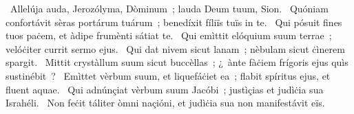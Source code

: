 {~Allelúja}
{%
auda, Jerozólyma, Dòminum~; lauda Deum tuum, Sion.
~Quóniam confortávit sèras portárum tuárum~; benedíxit fíliïs tuïs in te.
~Qui pósuit fines tuos paċem, et àdipe frumènti sátiat te.
~Qui emìttit elóquium suum terrae~; velóċiter currit sermo ejus.
~Qui dat nivem sicut lanam~; nèbulam sicut ċìnerem spargit.
~Mittit crystàllum suum sicut buccèllas~; ¿~ànte fàċiem frígoris ejus quìs sustinébit~?
~Emìttet vèrbum suum, et liquefáċiet ea~; flabit spíritus ejus, et fluent aquae.
~Qui adnúnçiat vèrbum suum Jacóbi~; justìçias et judìċia sua Israhéli.
~Non feċit táliter òmni naçióni, et judìċia sua non manifestávit eïs.
}
